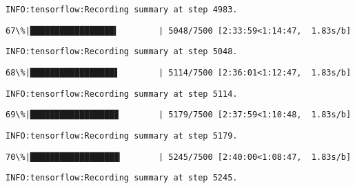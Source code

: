 \documentclass[11pt]{article}
\begin{document}
    \begin{Verbatim}[commandchars=\\\{\}]
INFO:tensorflow:Recording summary at step 4983.

    \end{Verbatim}

    \begin{Verbatim}[commandchars=\\\{\}]
 67\%|█████████████████▍        | 5048/7500 [2:33:59<1:14:47,  1.83s/b]
    \end{Verbatim}

    \begin{Verbatim}[commandchars=\\\{\}]
INFO:tensorflow:Recording summary at step 5048.

    \end{Verbatim}

    \begin{Verbatim}[commandchars=\\\{\}]
 68\%|█████████████████▋        | 5114/7500 [2:36:01<1:12:47,  1.83s/b]
    \end{Verbatim}

    \begin{Verbatim}[commandchars=\\\{\}]
INFO:tensorflow:Recording summary at step 5114.

    \end{Verbatim}

    \begin{Verbatim}[commandchars=\\\{\}]
 69\%|█████████████████▉        | 5179/7500 [2:37:59<1:10:48,  1.83s/b]
    \end{Verbatim}

    \begin{Verbatim}[commandchars=\\\{\}]
INFO:tensorflow:Recording summary at step 5179.

    \end{Verbatim}

    \begin{Verbatim}[commandchars=\\\{\}]
 70\%|██████████████████▏       | 5245/7500 [2:40:00<1:08:47,  1.83s/b]
    \end{Verbatim}

    \begin{Verbatim}[commandchars=\\\{\}]
INFO:tensorflow:Recording summary at step 5245.

    \end{Verbatim}
\end{document}
